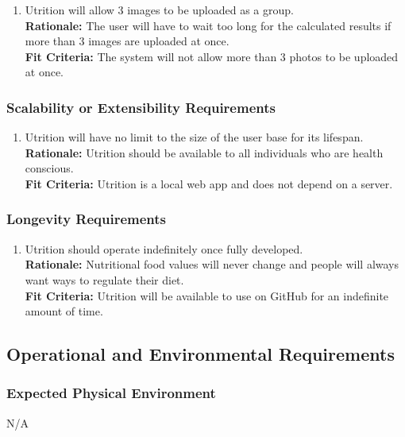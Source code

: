 \documentclass[12pt]{article}
\begin{document}
\begin{enumerate}[{PR}17. ] 
	\item Utrition will allow 3 images to be uploaded as a group.\\
	\textbf{Rationale:} The user will have to wait too long for the calculated results if more than 3 images are uploaded at once. \\
	\textbf{Fit Criteria:} The system will not allow more than 3 photos to be uploaded at once.
\end{enumerate}

\subsubsection{Scalability or Extensibility Requirements}

\begin{enumerate}[{PR}18. ] 
	\item Utrition will have no limit to the size of the user base for its lifespan. \\
	\textbf{Rationale:} Utrition should be available to all individuals who are health conscious.\\
	\textbf{Fit Criteria:} Utrition is a local web app and does not depend on a server.
\end{enumerate}

\subsubsection{Longevity Requirements}

\begin{enumerate}[{PR}19. ] 
	\item Utrition should operate indefinitely once fully developed.\\
	\textbf{Rationale:} Nutritional food values will never change and people will always want ways to regulate their diet. \\
	\textbf{Fit Criteria:} Utrition will be available to use on GitHub for an indefinite amount of time.
\end{enumerate}

\subsection{Operational and Environmental Requirements}

\subsubsection{Expected Physical Environment}
\hspace{1.5cm}N/A
\end{document}
